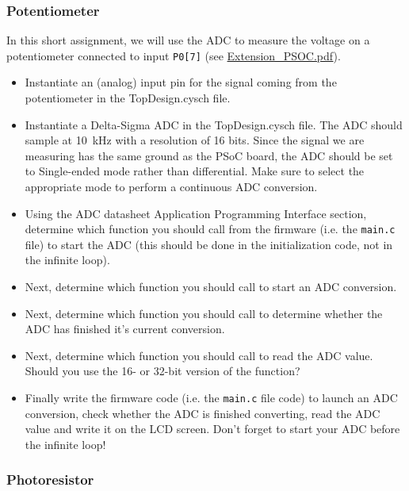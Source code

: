 \subsubsection{Potentiometer}

In this short assignment, we will use the ADC to measure the voltage on a potentiometer connected to input \texttt{P0[7]} (see \url{Extension\_PSOC.pdf}). 
\begin{itemize}
	\item Instantiate an (analog) input pin for the signal coming from the potentiometer in the TopDesign.cysch file.
	\item Instantiate a Delta-Sigma ADC in the TopDesign.cysch file. The ADC should sample at 10~kHz with a resolution of 16 bits. Since the signal we are measuring has the same ground as the PSoC board, the ADC should be set to Single-ended mode rather than differential. Make sure to select the appropriate mode to perform a continuous ADC conversion. 
	\item Using the ADC datasheet Application Programming Interface section, determine which function you should call from the firmware (i.e. the \texttt{main.c} file) to start the ADC (this should be done in the initialization code, not in the infinite loop).  
	\item Next, determine which function you should call to start an ADC conversion. 
	\item Next, determine which function you should call to determine whether the ADC has finished it's current conversion. 
	\item Next, determine which function you should call to read the ADC value. Should you use the 16- or 32-bit version of the function? 
	\item Finally write the firmware code (i.e. the \texttt{main.c} file code) to launch an ADC conversion, check whether the ADC is finished converting, read the ADC value and write it on the LCD screen. Don't forget to start your ADC before the infinite loop! 
\end{itemize}


\subsubsection{Photoresistor}

